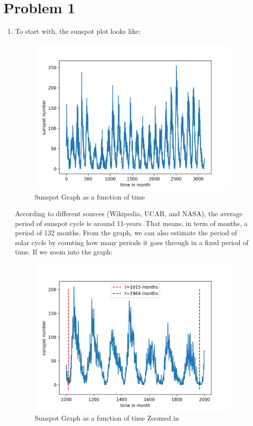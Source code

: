 \documentclass[12pt,letterpaper]{article}
\begin{document}
\section*{Problem 1}

\begin{enumerate}
  \item
   To start with, the sunspot plot looks like:
   
   \begin{figure}[h]
    \centering
    \includegraphics[width=1.\linewidth]{q1a.png}
    \caption{Sunspot Graph as a function of time}
    \end{figure}
    According to different sources (Wikipedia, UCAR, and NASA), the average period of sunspot cycle is around 11-years. That means, in term of months, a period of 132 months. 
    From the graph, we can also estimate the period of solar cycle by counting how many periods it goes through in a fixed period of time. If we zoom into the graph:
    
    \clearpage
    \begin{figure}[h]
    \centering
    \includegraphics[width=1.\linewidth]{q1b.png}
    \caption{Sunspot Graph as a function of time Zoomed in}
    \end{figure}
    

\end{enumerate}
\end{document}
